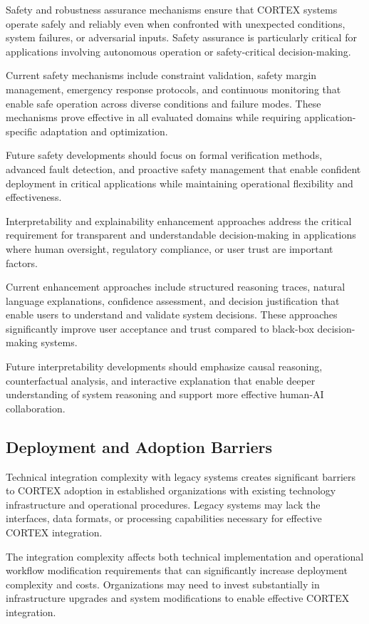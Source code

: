 Safety and robustness assurance mechanisms ensure that CORTEX systems operate safely and reliably even when confronted with unexpected conditions, system failures, or adversarial inputs. Safety assurance is particularly critical for applications involving autonomous operation or safety-critical decision-making.

Current safety mechanisms include constraint validation, safety margin management, emergency response protocols, and continuous monitoring that enable safe operation across diverse conditions and failure modes. These mechanisms prove effective in all evaluated domains while requiring application-specific adaptation and optimization.

Future safety developments should focus on formal verification methods, advanced fault detection, and proactive safety management that enable confident deployment in critical applications while maintaining operational flexibility and effectiveness.

Interpretability and explainability enhancement approaches address the critical requirement for transparent and understandable decision-making in applications where human oversight, regulatory compliance, or user trust are important factors.

Current enhancement approaches include structured reasoning traces, natural language explanations, confidence assessment, and decision justification that enable users to understand and validate system decisions. These approaches significantly improve user acceptance and trust compared to black-box decision-making systems.

Future interpretability developments should emphasize causal reasoning, counterfactual analysis, and interactive explanation that enable deeper understanding of system reasoning and support more effective human-AI collaboration.

\subsection{Deployment and Adoption Barriers}

Technical integration complexity with legacy systems creates significant barriers to CORTEX adoption in established organizations with existing technology infrastructure and operational procedures. Legacy systems may lack the interfaces, data formats, or processing capabilities necessary for effective CORTEX integration.

The integration complexity affects both technical implementation and operational workflow modification requirements that can significantly increase deployment complexity and costs. Organizations may need to invest substantially in infrastructure upgrades and system modifications to enable effective CORTEX integration.

